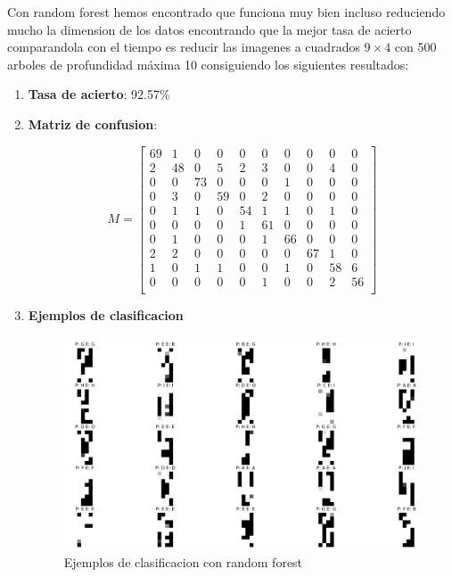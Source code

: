 \documentclass[8pt,a4paper]{article}
\begin{document}
Con random forest hemos encontrado que funciona muy bien incluso reduciendo mucho la dimension de los datos encontrando que la mejor tasa de acierto comparandola con el tiempo es reducir las imagenes a cuadrados $9\times4$ con 500 arboles de profundidad máxima 10 consiguiendo los siguientes resultados:
\begin{enumerate}
\item \textbf{Tasa de acierto}: 92.57$\%$
\item \textbf{Matriz de confusion}:
	
\[
M=
  \begin{bmatrix}
    69 & 1 & 0 & 0 & 0 & 0 & 0 & 0 & 0 & 0 \\
    2 & 48 & 0 & 5 & 2 & 3 & 0 & 0 & 4 & 0 \\
    0 & 0 & 73 & 0 & 0 & 0 & 1 & 0 & 0 & 0 \\
    0 & 3 & 0 & 59 & 0 & 2 & 0 & 0 & 0 & 0 \\
    0 & 1 & 1 & 0 & 54 & 1 & 1 & 0 & 1 & 0 \\
    0 & 0 & 0 & 0 & 1 & 61 & 0 & 0 & 0 & 0 \\
    0 & 1 & 0 & 0 & 0 & 1 & 66 & 0 & 0 & 0 \\
    2 & 2 & 0 & 0 & 0 & 0 & 0 & 67 & 1 & 0 \\
    1 & 0 & 1 & 1 & 0 & 0 & 1 & 0 & 58 & 6 \\
    0 & 0 & 0 & 0 & 0 & 1 & 0 & 0 & 2 & 56 \\
  \end{bmatrix}
\]

\item \textbf{Ejemplos de clasificacion}

\begin{figure}[htbp]
    \includegraphics[width=\textwidth]{./RandomForest_9_4.png}
    \caption{Ejemplos de clasificacion con random forest}
\end{figure}
\end{enumerate}
\end{document}
